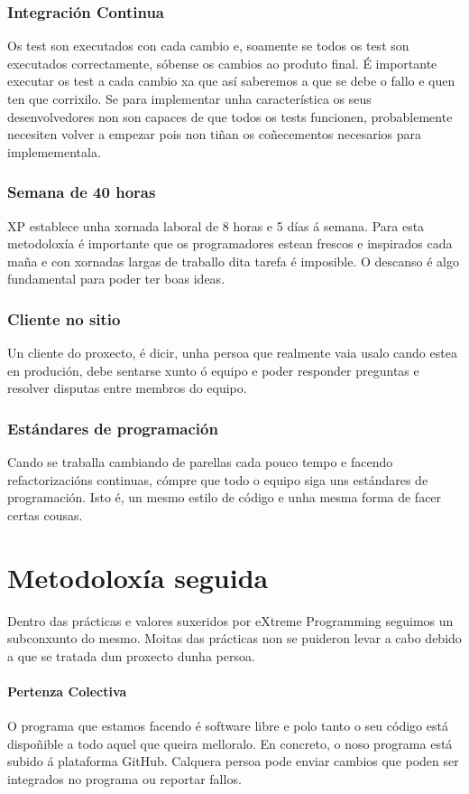 \subsubsection{Integración Continua}
Os test son executados con cada cambio e, soamente se todos os test son executados correctamente, sóbense os cambios ao produto final. É importante executar os test a cada cambio xa que así saberemos a que se debe o fallo e quen ten que corrixilo. Se para implementar unha característica os seus desenvolvedores non son capaces de que todos os tests funcionen, probablemente necesiten volver a empezar pois non tiñan os coñecementos necesarios para implemementala. 

\subsubsection{Semana de 40 horas}
XP establece unha xornada laboral de 8 horas e 5 días á semana. Para esta metodoloxía é importante que os programadores estean frescos e inspirados cada maña e con xornadas largas de traballo dita tarefa é imposible. O descanso é algo fundamental para poder ter boas ideas.

\subsubsection{Cliente no sitio}
Un cliente do proxecto, é dicir, unha persoa que realmente vaia usalo cando estea en produción, debe sentarse xunto ó equipo e poder responder preguntas e resolver disputas entre membros do equipo.

\subsubsection{Estándares de programación}
Cando se traballa cambiando de parellas cada pouco tempo e facendo refactorizacións continuas, cómpre que todo o equipo siga uns estándares de programación. Isto é, un mesmo estilo de código e unha mesma forma de facer certas cousas.

\section{Metodoloxía seguida}

Dentro das prácticas e valores suxeridos por eXtreme Programming seguimos un subconxunto do mesmo. Moitas das prácticas non se puideron levar a cabo debido a que se tratada dun proxecto dunha persoa.

\paragraph{Pertenza Colectiva} O programa que estamos facendo é software libre e polo tanto o seu código está dispoñible a todo aquel que queira melloralo. En concreto, o noso programa está subido á plataforma GitHub. Calquera persoa pode enviar cambios que poden ser integrados no programa ou reportar fallos.

